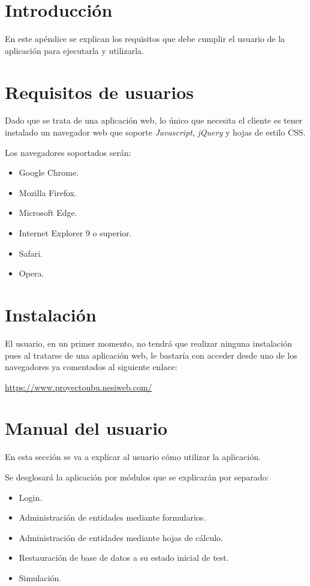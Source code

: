
\section{Introducción}

En este apéndice se explican los requisitos que debe cumplir el usuario de la aplicación para ejecutarla y utilizarla. 

\section{Requisitos de usuarios}

Dado que se trata de una aplicación web, lo único que necesita el cliente es tener instalado un navegador web que soporte \textit{Javascript}, \textit{jQuery} y hojas de estilo CSS.

Los navegadores soportados serán:
\begin{itemize}
	\item Google Chrome.
	\item Mozilla Firefox.
	\item Microsoft Edge.
	\item Internet Explorer 9 o superior.
	\item Safari.
	\item Opera.
\end{itemize}

\section{Instalación}

El usuario, en un primer momento, no tendrá que realizar ninguna instalación pues al tratarse de una aplicación web, le bastaría con acceder desde uno de los navegadores ya comentados al siguiente enlace: 

\url{https://www.proyectoubu.nesiweb.com/}

\section{Manual del usuario}

En esta sección se va a explicar al usuario cómo utilizar la aplicación.

Se desglosará la aplicación por módulos que se explicarán por separado:
\begin{itemize}
	\item Login.
	\item Administración de entidades mediante formularios.
	\item Administración de entidades mediante hojas de cálculo.
	\item Restauración de base de datos a su estado inicial de test.
	\item Simulación.
\end{itemize}

